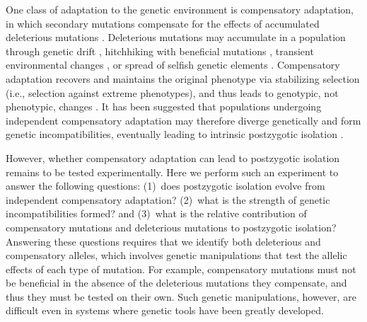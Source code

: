 \documentclass[12pt]{article}
\begin{document}
One class of adaptation to the genetic environment
is compensatory adaptation, in which secondary mutations
compensate for the effects of accumulated deleterious mutations
\cite{har96,bur99,moo00,lev00,mai02,est03,est11}.
%
Deleterious mutations may accumulate in a population
through genetic drift \cite{lan94,lyn95},
hitchhiking with beneficial mutations \cite{chu11},
transient environmental changes \cite{bjo00},
or spread of selfish genetic elements \cite{pre10}.
%
Compensatory adaptation recovers and maintains the original phenotype
via stabilizing selection (i.e., selection against extreme phenotypes),
and thus leads to genotypic, not phenotypic, changes \cite{har96}.
%
It has been suggested that populations undergoing independent
compensatory adaptation may therefore diverge genetically
and form genetic incompatibilities,
eventually leading to intrinsic postzygotic isolation
\cite{har96,orr01,kon02,kul04,lan07,sch09b,pre10}.



However, whether compensatory adaptation can lead to postzygotic isolation
remains to be tested experimentally.
%
Here we perform such an experiment to answer the following questions:
(1)~does postzygotic isolation evolve from independent compensatory adaptation?
(2)~what is the strength of genetic incompatibilities formed?
and (3)~what is the relative contribution of compensatory mutations
and deleterious mutations to postzygotic isolation?
%
Answering these questions requires that we identify
both deleterious and compensatory alleles,
which involves genetic manipulations that test the allelic
effects of each type of mutation.
%
For example, compensatory mutations must not be beneficial
in the absence of the deleterious mutations they compensate,
and thus they must be tested on their own.
%
Such genetic manipulations, however, are difficult even in
systems where genetic tools have been greatly developed.
\end{document}
